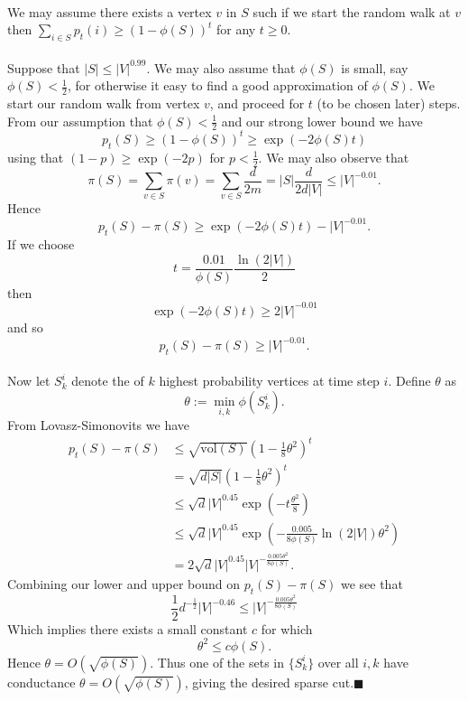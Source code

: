 \documentclass[letterpaper,12pt,oneside,onecolumn]{article}
\begin{document}
	\paragraph{}
	We may assume there exists a vertex $v$ in $S$ such if we start the random walk at $v$ then $\sum_{i \in S}p_t(i)\geq (1-\phi(S))^t$ for any $t\geq 0$.
	\paragraph{}
	Suppose that $|S| \leq |V|^{0.99}$. We may also assume that $\phi(S)$ is small, say $\phi(S) < \frac{1}{2}$, for otherwise it easy to find a good approximation of $\phi(S)$. We start our random walk from vertex $v$, and proceed for $t$ (to be chosen later) steps. From our assumption that $\phi(S)<\frac{1}{2}$ and our strong lower bound we have
	$$p_t(S) \geq (1-\phi(S))^t \geq \exp(-2\phi(S)t)$$
	using that $(1-p)\geq \exp(-2p)$ for $p<\frac{1}{2}$.
	We may also observe that
	$$\pi(S) = \sum_{v\in S} \pi(v) = \sum_{v\in S} \frac{d}{2m} = |S|\frac{d}{2d|V|}\leq |V|^{-0.01}.$$
	Hence
	$$p_t(S) - \pi(S) \geq \exp(-2\phi(S)t) - |V|^{-0.01}.$$
	If we choose 
	$$t = \frac{0.01}{\phi(S)}\frac{\ln(2|V|)}{2}$$	
	then
	$$\exp(-2\phi(S)t) \geq 2|V|^{-0.01}$$
	and so
	$$p_t(S) - \pi(S) \geq |V|^{-0.01}.$$
	\paragraph{}
	Now let $S_k^i$ denote the of $k$ highest probability vertices at time step $i$. Define $\theta$ as
	$$\theta:= \min_{i,k}\phi(S_k^i).$$
	From Lovasz-Simonovits we have
	\begin{align*}
	p_t(S) - \pi(S) &\leq \sqrt{\text{vol}(S)}(1-\frac{1}{8}\theta^2)^t\\
	&= \sqrt{d|S|}(1-\frac{1}{8}\theta^2)^t\\
	&\leq \sqrt{d}|V|^{0.45}\exp(-t\frac{\theta^2}{8})\\
	&\leq \sqrt{d}|V|^{0.45}\exp(-\frac{0.005}{8\phi(S)}\ln(2|V|)\theta^2)\\
	&=2\sqrt{d}|V|^{0.45}|V|^{-\frac{0.005\theta^2}{8\phi(S)}}.
	\end{align*}
	Combining our lower and upper bound on $p_t(S)-\pi(S)$ we see that
	$$\frac{1}{2}d^{-\frac{1}{2}}|V|^{-0.46} \leq |V|^{-\frac{0.005\theta^2}{8\phi(S)}}$$
	Which implies there exists a small constant $c$ for which
	$$\theta^2 \leq c\phi(S).$$
	Hence $\theta = O(\sqrt{\phi(S)}).$ Thus one of the sets in $\{S^i_k\}$ over all $i,k$ have conductance $\theta=O(\sqrt{\phi(S)})$, giving the desired sparse cut.$\blacksquare$
	\newpage
\end{document}
